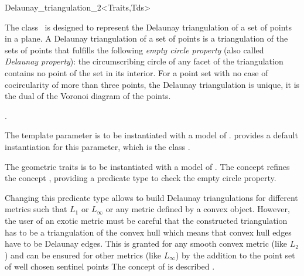 

\begin{ccRefClass}{Delaunay_triangulation_2<Traits,Tds>}  %


\ccDefinition
  
The class \ccRefName\ is designed to represent
the Delaunay triangulation of a set of points in a plane.
A  Delaunay triangulation of a set of points
is a triangulation of the sets of points that fulfills
the following {\em empty circle property} 
(also called {\em Delaunay property}): the circumscribing
circle of any facet
of the triangulation contains no point of the set in its interior.
For a point set with no case of cocircularity 
of more than three points,
the Delaunay triangulation is unique, it is  the dual
of the Voronoi diagram of the points.

\ccInheritsFrom
{}.

\ccParameter
The template parameter 
is to be instantiated with a model of
.
\cgal provides a default instantiation for this parameter,
which is the class 
.

The geometric traits  
is to be instantiated with a model of
.
The concept  refines the
concept , providing
a predicate type 
to check the empty circle property.

Changing this predicate type
allows to build Delaunay triangulations for different metrics
such that $L_1$ or $L_{\infty}$ or any metric defined by a
convex object. However, the user of an exotic metric
must be careful that the constructed triangulation 
has to be a triangulation of the convex hull
which means that convex hull edges have to be Delaunay edges.
This is granted for any smooth convex metric (like $L_2$)
and can be ensured for other metrics (like  $L_{\infty}$)
by the addition to the point set of well chosen sentinel points
The concept of  is  described
.


\end{ccRefClass}
